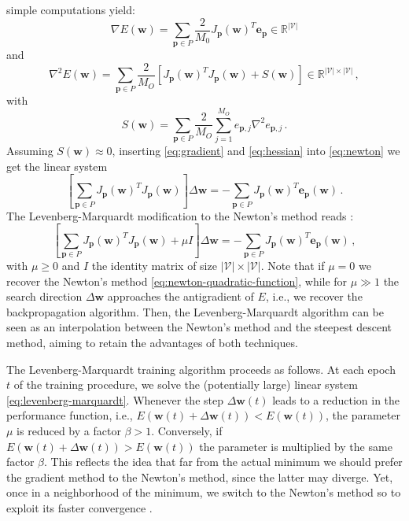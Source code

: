 \documentclass[12pt, a4paper, twoside, openright]{report}
\numberwithin{equation}{chapter}
\theoremstyle{theorem}
\theoremstyle{definition}
\theoremstyle{remark}
\theoremstyle{proposition}
\numberwithin{figure}{chapter}
\begin{document}
		simple computations yield:
		\begin{equation}
			\label{eq:gradient}
			\nabla E(\mathbf{w}) = \sum_{\mathbf{p} \in P} \dfrac{2}{M_0} J_{\mathbf{p}}(\mathbf{w})^T \mathbf{e}_{\mathbf{p}} \in \mathbb{R}^{|\mathcal{V}|}
		\end{equation}
		and
		\begin{equation}
			\label{eq:hessian}
			\nabla^2 E(\mathbf{w}) = \sum_{\mathbf{p} \in P} \dfrac{2}{M_O} \left[ J_{\mathbf{p}}(\mathbf{w})^T J_{\mathbf{p}}(\mathbf{w}) + S(\mathbf{w}) \right] \in \mathbb{R}^{|\mathcal{V}| \times |\mathcal{V}|} \, ,
		\end{equation}
		with
		\begin{equation*}
			S(\mathbf{w}) = \sum_{\mathbf{p} \in P} \dfrac{2}{M_O} \sum_{j = 1}^{M_O} e_{\mathbf{p},j} \nabla^2 e_{\mathbf{p},j} \, .
		\end{equation*}
		Assuming $S(\mathbf{w}) \approx 0$, inserting \eqref{eq:gradient} and \eqref{eq:hessian} into \eqref{eq:newton} we get the linear system
		\begin{equation}
			\label{eq:newton-quadratic-function}
			\left[ \sum_{\mathbf{p} \in P} J_{\mathbf{p}}(\mathbf{w})^T J_{\mathbf{p}}(\mathbf{w}) \right] \Delta \mathbf{w} = - \sum_{\mathbf{p} \in P} J_{\mathbf{p}}(\mathbf{w})^T \mathbf{e}_{\mathbf{p}}(\mathbf{w}) \, .
		\end{equation} 
		The Levenberg-Marquardt modification to the Newton's method reads \cite{Hag94, Mar63}:
		\begin{equation}
			\label{eq:levenberg-marquardt}
			\left[ \sum_{\mathbf{p} \in P} J_{\mathbf{p}}(\mathbf{w})^T J_{\mathbf{p}}(\mathbf{w}) + \mu I \right] \Delta \mathbf{w} = - \sum_{\mathbf{p} \in P} J_{\mathbf{p}}(\mathbf{w})^T \mathbf{e}_{\mathbf{p}}(\mathbf{w}) \, ,
		\end{equation}
		with $\mu \geq 0$ and $I$ the identity matrix of size $|\mathcal{V}| \times |\mathcal{V}|$. Note that if $\mu = 0$ we recover the Newton's method \eqref{eq:newton-quadratic-function}, while for $\mu \gg 1$ the search direction $\Delta \mathbf{w}$ approaches the antigradient of $E$, i.e., we recover the backpropagation algorithm. Then, the Levenberg-Marquardt algorithm can be seen as an interpolation between the Newton's method and the steepest descent method, aiming to retain the advantages of both techniques.
		
		The Levenberg-Marquardt training algorithm proceeds as follows. At each epoch $t$ of the training procedure, we solve the (potentially large) linear system \eqref{eq:levenberg-marquardt}. Whenever the step $\Delta \mathbf{w}(t)$ leads to a reduction in the performance function, i.e., $E(\mathbf{w}(t) + \Delta \mathbf{w}(t)) < E(\mathbf{w}(t))$, the parameter $\mu$ is reduced by a factor $\beta > 1$. Conversely, if $E(\mathbf{w}(t) + \Delta \mathbf{w}(t)) > E(\mathbf{w}(t))$ the parameter is multiplied by the same factor $\beta$. This reflects the idea that far from the actual minimum we should prefer the gradient method to the Newton's method, since the latter may diverge. Yet, once in a neighborhood of the minimum, we switch to the Newton's method so to exploit its faster convergence \cite{Mar63}.
		
\end{document}
